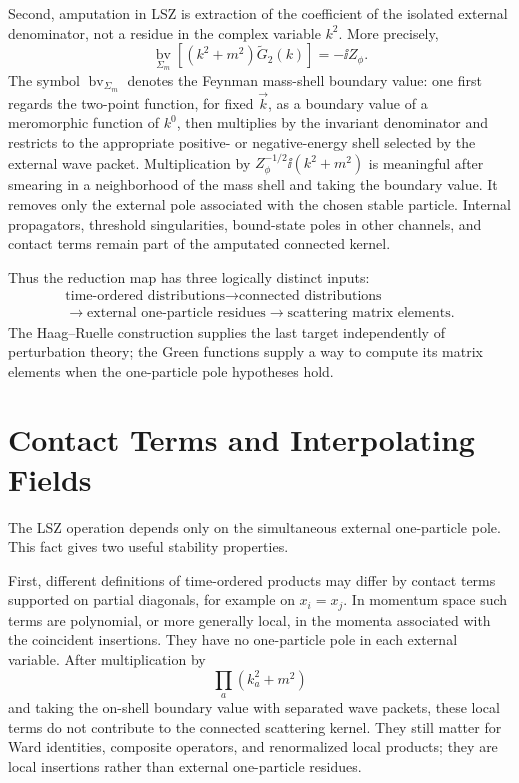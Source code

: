 \begin{definition}
\label{def:lsz-external-amputation-map}
Second, amputation in LSZ is extraction of the coefficient of the isolated
external denominator, not a residue in the complex variable \(k^2\).  More
precisely,
\[
  \operatorname*{bv}_{\Sigma_m}
  \left[
    (k^2+m^2)\widetilde G_2(k)
  \right]
  =
  -\ii Z_\phi .
\]
The symbol \(\operatorname*{bv}_{\Sigma_m}\) denotes the Feynman mass-shell
boundary value: one first regards the two-point function, for fixed \(\vec k\),
as a boundary value of a meromorphic function of \(k^0\), then multiplies by
the invariant denominator and restricts to the appropriate positive- or
negative-energy shell selected by the external wave packet.
Multiplication by \(Z_\phi^{-1/2}\ii(k^2+m^2)\) is meaningful after smearing in a
neighborhood of the mass shell and taking the boundary value.  It removes
only the external pole associated with the chosen stable particle.  Internal
propagators, threshold singularities, bound-state poles in other channels,
and contact terms remain part of the amputated connected kernel.

Thus the reduction map has three logically distinct inputs:
\[
  \begin{gathered}
  \text{time-ordered distributions}
  \longrightarrow
  \text{connected distributions}
  \\
  \longrightarrow
  \text{external one-particle residues}
  \longrightarrow
  \text{scattering matrix elements}.
  \end{gathered}
\]
The Haag--Ruelle construction supplies the last target independently of
perturbation theory; the Green functions supply a way to compute its matrix
elements when the one-particle pole hypotheses hold.
\end{definition}

\section{Contact Terms and Interpolating Fields}

The LSZ operation depends only on the simultaneous external one-particle pole.
This fact gives two useful stability properties.

First, different definitions of time-ordered products may differ by contact
terms supported on partial diagonals, for example on \(x_i=x_j\).  In momentum
space such terms are polynomial, or more generally local, in the momenta
associated with the coincident insertions.  They have no one-particle pole in
each external variable.  After multiplication by
\[
  \prod_a (k_a^2+m^2)
\]
and taking the on-shell boundary value with separated wave packets, these
local terms do not contribute to the connected scattering kernel.  They still
matter for Ward identities, composite operators, and renormalized local
products; they are local insertions rather than external one-particle
residues.

